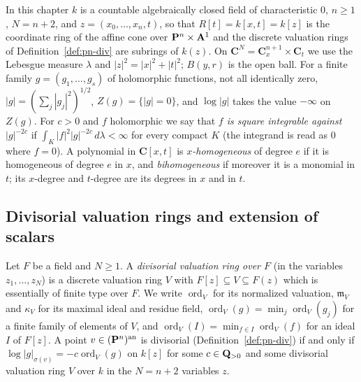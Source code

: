 \begin{convention}\label{conv:c0}
In this chapter $k$ is a countable algebraically closed field of characteristic $0$, $n\ge1$, $N=n+2$, and
$z=(x_0,\dots,x_n,t)$, so that $R[t]=k[x,t]=k[z]$ is the coordinate ring of the affine cone over
$\mathbf{P}^n\times\mathbf{A}^1$ and the discrete valuation rings of Definition~\ref{def:pn-div} are subrings of
$k(z)$. On $\mathbf C^N=\mathbf C^{n+1}_x\times\mathbf C_t$ we use the Lebesgue measure $\lambda$ and
$|z|^2=|x|^2+|t|^2$; $B(y,r)$ is the open ball. For a finite family $g=(g_1,\dots,g_s)$ of holomorphic
functions, not all identically zero, $|g|=(\sum_j|g_j|^2)^{1/2}$, $Z(g)=\{|g|=0\}$, and $\log|g|$ takes the
value $-\infty$ on $Z(g)$. For $c>0$ and $f$ holomorphic we say that \emph{$f$ is square integrable
against $|g|^{-2c}$} if $\int_K|f|^2|g|^{-2c}\,d\lambda<\infty$ for every compact $K$ (the integrand is
read as $0$ where $f=0$). A polynomial in $\mathbf C[x,t]$ is \emph{$x$-homogeneous} of degree $e$ if it
is homogeneous of degree $e$ in $x$, and \emph{bihomogeneous} if moreover it is a monomial in $t$; its
$x$-degree and $t$-degree are its degrees in $x$ and in $t$.
\end{convention}

\subsection{Divisorial valuation rings and extension of scalars}

\begin{definition}\label{def:c0-dvr}
\leanok
{}
Let $F$ be a field and $N\ge1$. A \emph{divisorial valuation ring over $F$} (in the variables
$z_1,\dots,z_N$) is a discrete valuation ring $V$ with $F[z]\subseteq V\subseteq F(z)$ which is essentially of
finite type over $F$. We write $\operatorname{ord}_V$ for its normalized valuation, $\mathfrak m_V$ and $\kappa_V$ for its maximal
ideal and residue field, $\operatorname{ord}_V(g)=\min_j\operatorname{ord}_V(g_j)$ for a finite family of elements of $V$, and
$\operatorname{ord}_V(I)=\min_{f\in I}\operatorname{ord}_V(f)$ for an ideal $I$ of $F[z]$. A point $v\in(\mathbf{P}^n)^{\mathrm{an}}$ is divisorial
(Definition~\ref{def:pn-div}) if and only if $\log|g|_{\sigma(v)}=-c\operatorname{ord}_V(g)$ on $k[z]$ for some
$c\in\mathbf{Q}_{>0}$ and some divisorial valuation ring $V$ over $k$ in the $N=n+2$ variables $z$.
\end{definition}

